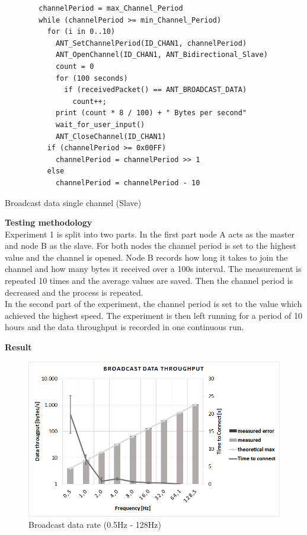 \begin{description}
	\begin{code}[H]
		\begin{verbatim}
		channelPeriod = max_Channel_Period
		while (channelPeriod >= min_Channel_Period) 
		  for (i in 0..10) 
		    ANT_SetChannelPeriod(ID_CHAN1, channelPeriod)
		    ANT_OpenChannel(ID_CHAN1, ANT_Bidirectional_Slave)
		    count = 0
		    for (100 seconds) 
		      if (receivedPacket() == ANT_BROADCAST_DATA)
		        count++;			  
		    print (count * 8 / 100) + " Bytes per second"
		    wait_for_user_input()
		    ANT_CloseChannel(ID_CHAN1)
		  if (channelPeriod >= 0x00FF)
		    channelPeriod = channelPeriod >> 1
		  else
		    channelPeriod = channelPeriod - 10
		\end{verbatim}
		\caption{Broadcast data single channel (Slave)}\label{lst:sExp1}
	\end{code}	
	\item{\textbf{Testing methodology}} \hfill \\Experiment 1 is split into two parts.
	In the first part node A acts as the master and node B as the slave. For both nodes the channel period is set to the highest value and the channel is opened. Node B records how long it takes to join the channel and how many bytes it received over a 100s interval. The measurement is repeated 10 times and the average values are saved. Then the channel period is decreased and the process is repeated.\\ 
	In the second part of the experiment, the channel period is set to the value which achieved the highest speed. The experiment is then left running for a period of 10 hours and the data throughput is recorded in one continuous run.
	\item{\textbf{Result}} \hfill \\  
	\begin{figure}[H]
		\centering
		\includegraphics[scale=0.5]{content/images/exp1_norm.png}
		\caption{Broadcast data rate (0.5Hz - 128Hz)}\label{fig:exp1norm}
	\end{figure}
	

\end{description}
